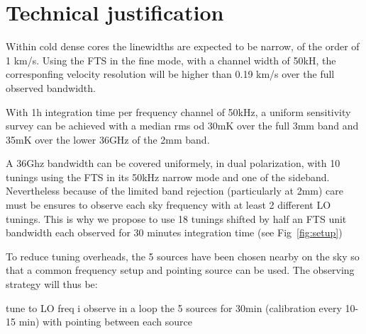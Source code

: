 \section{Technical justification}
  Within cold dense cores the linewidths are expected to be narrow, of the order of 1 km/s. Using the FTS in the fine mode, with a channel width of 50kH, the corresponfing velocity resolution will be higher than 0.19 km/s over the full observed bandwidth. 

With 1h integration time per frequency channel of 50kHz, a uniform sensitivity survey can be achieved with a median rms od 30mK over the full 3mm band and 35mK over the lower 36GHz of the 2mm band. 

A 36Ghz bandwidth can be covered uniformely, in dual polarization, with 10 tunings using the FTS in its 50kHz narrow mode and one of the sideband. Nevertheless because of the limited band rejection (particularly at 2mm) care must be ensures to observe each sky frequency with at least 2 different LO tunings. This is why we propose to use 18 tunings shifted by half an FTS unit bandwidth each observed for 30 minutes integration time (see Fig~\ref{fig:setup})

To reduce tuning overheads, the 5 sources have been chosen nearby on the sky so that a common frequency setup and pointing source can be used. The observing strategy will thus be: 

tune to LO freq i
observe in a loop the 5 sources for 30min (calibration every 10-15 min) with pointing between each source 

   
  
  
  
  
  
  
  
  